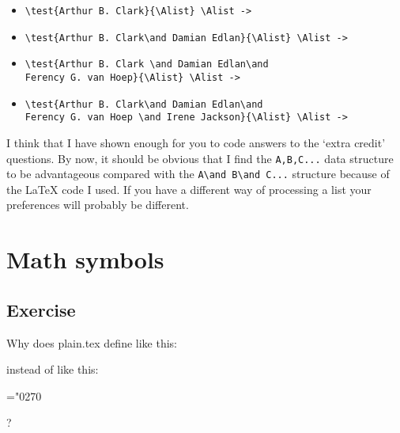 \begin{itemize}
\item \verb?\test{Arthur B. Clark}{\Alist} \Alist ->? \\
       \Alist 

\item \verb?\test{Arthur B. Clark\and Damian Edlan}{\Alist} \Alist ->? \\ 
       \Alist 

\item \verb?\test{Arthur B. Clark \and Damian Edlan\and? \\
      \verb?Ferency G. van Hoep}{\Alist} \Alist ->?  \\ 
       \Alist 

\item \verb?\test{Arthur B. Clark\and Damian Edlan\and? \\
      \verb?Ferency G. van Hoep \and Irene Jackson}{\Alist} \Alist ->? \\
       \Alist 
\end{itemize}

    I think that I have shown enough for you to code answers
to the `extra credit' questions. By now, it should be obvious that I find
the \verb?A,B,C...? data structure to be advantageous compared with the
\verb?A\and B\and C...? structure because of the LaTeX \cmd{\@for} code I used.
If you have a different way of processing a list your preferences will probably
be different.



\chapter{Math symbols}


\section{Exercise}



Why does plain.tex define \cmd{\surd} like this: 
\begin{lcode}
\def\surd{{\mathchar"1270}}
\end{lcode}
instead of like this:
\begin{lcode}
\mathchardef\surd="0270
\end{lcode}
?

